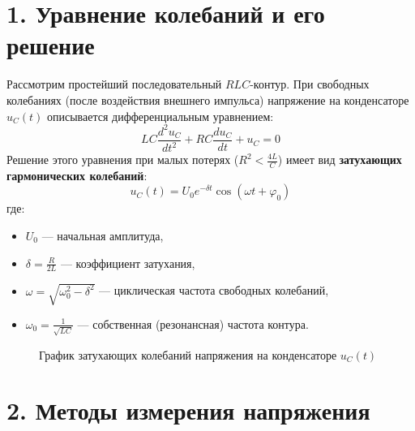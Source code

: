 \documentclass[a4paper]{article}
\begin{document}
\section*{1. Уравнение колебаний и его решение}
Рассмотрим простейший последовательный $RLC$-контур. При свободных колебаниях (после воздействия внешнего импульса) напряжение на конденсаторе $u_C(t)$ описывается дифференциальным уравнением:
\[
LC\frac{d^2u_C}{dt^2} + RC\frac{du_C}{dt} + u_C = 0
\]
Решение этого уравнения при малых потерях ($R^2 < \frac{4L}{C}$) имеет вид \textbf{затухающих гармонических колебаний}:
\begin{equation}
\boxed{u_C(t) = U_0 e^{-\delta t} \cos(\omega t + \varphi_0)}
\end{equation}
где:
\begin{itemize}
    \item $U_0$ — начальная амплитуда,
    \item $\delta = \frac{R}{2L}$ — коэффициент затухания,
    \item $\omega = \sqrt{\omega_0^2 - \delta^2}$ — циклическая частота свободных колебаний,
    \item $\omega_0 = \frac{1}{\sqrt{LC}}$ — собственная (резонансная) частота контура.
\end{itemize}

\begin{figure}[h!]
\centering
{}
\caption{График затухающих колебаний напряжения на конденсаторе $u_C(t)$}
\end{figure}

\section*{2. Методы измерения напряжения}
\end{document}
